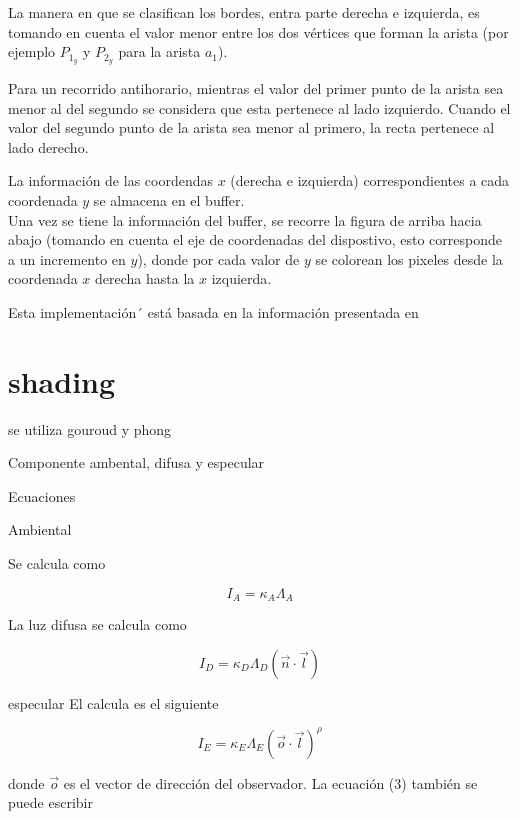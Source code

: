 \documentclass[12pt]{article}
\begin{document}
La manera en que se clasifican los bordes, entra parte derecha e izquierda, es tomando en cuenta el valor menor entre los dos vértices que forman la arista (por ejemplo $P_{1_{y}}$ y $P_{2_{y}}$ para la arista $a_{1}$).

Para un recorrido antihorario, mientras el valor del primer punto de la arista sea menor al del segundo se considera que esta pertenece al lado izquierdo. Cuando el valor del segundo punto de la arista sea menor al primero, la recta pertenece al lado derecho. 

La información de las coordendas $x$ (derecha e izquierda) correspondientes a cada coordenada $y$ se almacena en el buffer.\\

Una vez se tiene la información del buffer, se recorre la figura de arriba hacia abajo (tomando en cuenta el eje de coordenadas del dispostivo, esto corresponde a un incremento en  $y$), donde por cada valor de $y$ se colorean los pixeles desde la coordenada $x$ derecha hasta la $x$ izquierda.

Esta implementación´ está basada en la información presentada en \cite{bb}


\section{shading}
se utiliza gouroud y phong

Componente ambental, difusa y especular

Ecuaciones

Ambiental

Se calcula como

\begin{equation}
I_{A}=\kappa_{A}\Lambda_{A}
\end{equation}

La luz difusa se calcula como 

\begin{equation}
I_{D}=\kappa_{D}\Lambda_{D}(\vec{n} \cdot \vec{l})
\end{equation}

especular
El calcula es el siguiente

\begin{equation} \label{eq:3}
I_{E}=\kappa_{E}\Lambda_{E}(\vec{o} \cdot \vec{l})^{\rho}
\end{equation}

donde $\vec{o}$ es el vector de dirección del observador. La ecuación (3) también se puede escribir
\end{document}
